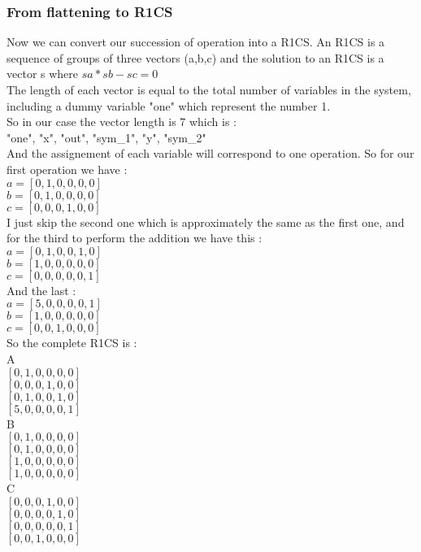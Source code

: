 \subsubsection{From flattening to R1CS}
Now we can convert our succession of operation into a R1CS. An R1CS is a sequence of groups of three vectors (a,b,c) and the solution to an R1CS is a vector s where $sa * sb - sc = 0$
\\The length of each vector is equal to the total number of variables in the system, including a dummy variable "one" which represent the number 1.
\\So in our case the vector length is 7 which is : 
\\"one", "x", "out", "sym\_1", "y", "sym\_2"
\\And the assignement of each variable will correspond to one operation. So for our first operation we have :
\\$a=[0,1,0,0,0,0]$
\\$b=[0,1,0,0,0,0]$
\\$c=[0,0,0,1,0,0]$
\\I just skip the second one which is approximately the same as the first one, and for the third to perform the addition we have this :
\\$a=[0,1,0,0,1,0]$
\\$b=[1,0,0,0,0,0]$
\\$c=[0,0,0,0,0,1]$
\\And the last :
\\$a=[5,0,0,0,0,1]$
\\$b=[1,0,0,0,0,0]$
\\$c=[0,0,1,0,0,0]$
\\So the complete R1CS is :
\\A
\\$[0,1,0,0,0,0]$
\\$[0,0,0,1,0,0]$
\\$[0,1,0,0,1,0]$
\\$[5,0,0,0,0,1]$
\\B
\\$[0,1,0,0,0,0]$
\\$[0,1,0,0,0,0]$
\\$[1,0,0,0,0,0]$
\\$[1,0,0,0,0,0]$
\\C
\\$[0,0,0,1,0,0]$
\\$[0,0,0,0,1,0]$
\\$[0,0,0,0,0,1]$
\\$[0,0,1,0,0,0]$

